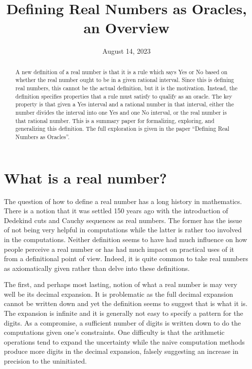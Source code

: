 \documentclass[12pt]{article}
\title{Defining Real Numbers as Oracles, an Overview}
\date{August 14, 2023}
\begin{document}
\maketitle
\begin{abstract}
A new definition of a real number is that it is a rule which says Yes or No based on whether the real number ought to be in a given rational interval. Since this is defining real numbers, this cannot be the actual definition, but it is the motivation. Instead, the definition specifies properties that a rule must satisfy to qualify as an oracle. The key property is that given a Yes interval and a rational number in that interval, either the number divides the interval into one Yes and one No interval, or the real number is that rational number. This is a summary paper for formalizing, exploring, and generalizing this definition. The full exploration is given in the paper ``Defining Real Numbers as Oracles''. 
\end{abstract}



\section{What is a real number?}

The question of how to define a real number has a long history in mathematics. There is a notion that it was settled 150 years ago with the introduction of Dedekind cuts and Cauchy sequences as real numbers. The former has the issue of not being very helpful in computations while the latter is rather too involved in the computations. Neither definition seems to have had much influence on how people perceive a real number or has had much impact on practical uses of it from a definitional point of view. Indeed, it is quite common to take real numbers as axiomatically given rather than delve into these definitions.

The first, and perhaps most lasting, notion of what a real number is may very well be its decimal expansion. It is problematic as the full decimal expansion cannot be written down and yet the definition seems to suggest that is what it is. The expansion is infinite and it is generally not easy to specify a pattern for the digits. As a compromise, a sufficient number of digits is written down to do the computations given one's constraints. One difficulty is that the arithmetic operations tend to expand the uncertainty while the naive computation methods produce more digits in the decimal expansion, falsely suggesting an increase in precision to the uninitiated.
\end{document}
